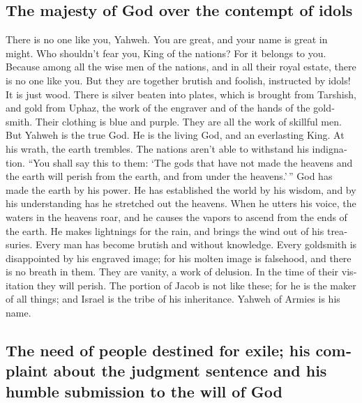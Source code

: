 \begin{paracol}{2}
\begin{otherlanguage}{english}
\hypertarget{the-majesty-of-god-over-the-contempt-of-idols}{%
\subsection{The majesty of God over the contempt of
idols}\label{the-majesty-of-god-over-the-contempt-of-idols}}

 There is no one like you, Yahweh. You are great, and your
name is great in might.  Who shouldn't fear you, King of
the nations? For it belongs to you. Because among all the wise men of
the nations, and in all their royal estate, there is no one like you.
 But they are together brutish and foolish, instructed by
idols! It is just wood.  There is silver beaten into
plates, which is brought from Tarshish, and gold from Uphaz, the work of
the engraver and of the hands of the goldsmith. Their clothing is blue
and purple. They are all the work of skillful men.  But
Yahweh is the true God. He is the living God, and an everlasting King.
At his wrath, the earth trembles. The nations aren't able to withstand
his indignation.  ``You shall say this to them: `The gods
that have not made the heavens and the earth will perish from the earth,
and from under the heavens.'\,''  God has made the earth
by his power. He has established the world by his wisdom, and by his
understanding has he stretched out the heavens.  When he
utters his voice, the waters in the heavens roar, and he causes the
vapors to ascend from the ends of the earth. He makes lightnings for the
rain, and brings the wind out of his treasuries.  Every
man has become brutish and without knowledge. Every goldsmith is
disappointed by his engraved image; for his molten image is falsehood,
and there is no breath in them.  They are vanity, a work
of delusion. In the time of their visitation they will perish.
 The portion of Jacob is not like these; for he is the
maker of all things; and Israel is the tribe of his inheritance. Yahweh
of Armies is his name.

\hypertarget{the-need-of-people-destined-for-exile-his-complaint-about-the-judgment-sentence-and-his-humble-submission-to-the-will-of-god}{%
\subsection{The need of people destined for exile; his complaint about
the judgment sentence and his humble submission to the will of
God}\label{the-need-of-people-destined-for-exile-his-complaint-about-the-judgment-sentence-and-his-humble-submission-to-the-will-of-god}}


\end{otherlanguage}
\end{paracol}
